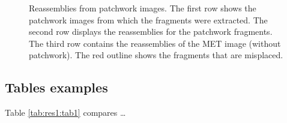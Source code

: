 \begin{figure}
    \hfill
    \hfill
    \hfill
\vspace{2em}
    \caption[Some reassemblies from patchwork images]{Reassemblies from patchwork images. The first row shows the patchwork images from which the fragments were extracted. The second row displays the reassemblies for the patchwork fragments. The third row contains the reassemblies of the MET image (without patchwork). The red outline shows the fragments that are misplaced. }
    \label{fig:res1:fig4}
\end{figure}



\subsection{Tables examples}

Table \ref{tab:res1:tab1} compares … \blindtext

